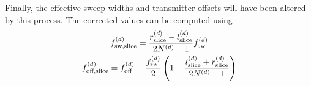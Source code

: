 Finally, the effective sweep widths and transmitter offsets will have been
altered by this process. The corrected values can be computed using
\begin{subequations}
    \begin{gather}
        f_{\text{sw,slice}}^{(d)} = \frac{r_{\text{slice}}^{(d)} - l_{\text{slice}}^{(d)}}{2 N^{(d)} - 1} f_{\mathrm{sw}}^{(d)} \\
        f_{\text{off,slice}}^{(d)} = f_{\mathrm{off}}^{(d)} + \frac{f_{\mathrm{sw}}^{(d)}}{2} \left( 1 - \frac{l_{\text{slice}}^{(d)} + r_{\text{slice}}^{(d)}}{2 N^{(d)} - 1}\right)
    \end{gather}
\end{subequations}
